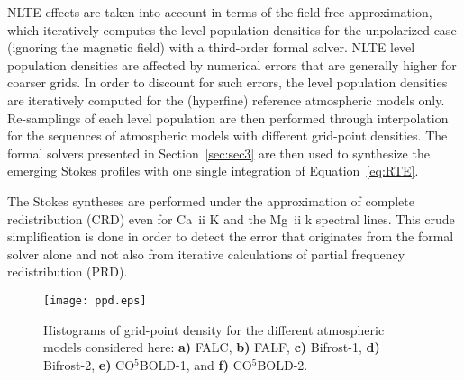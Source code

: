 \documentclass[iop,numberedappendix,twocolappendix,twocolumn]{emulateapj}
\begin{document}
NLTE effects are taken into account in terms of the field-free approximation,
which iteratively computes the level population densities for the unpolarized case (ignoring the magnetic field) with a third-order formal solver. 
NLTE level population densities are affected by numerical errors that are generally higher for coarser grids.
In order to discount for such errors,
the level population densities are iteratively computed for the (hyperfine) reference atmospheric models only.
Re-samplings of each level population are then performed through interpolation for the sequences of atmospheric models with different grid-point densities.
The formal solvers presented in Section~\ref{sec:sec3} are then used to 
synthesize the emerging Stokes profiles with one single integration of Equation~\eqref{eq:RTE}.

The Stokes syntheses are performed under the approximation of complete redistribution (CRD) even for Ca~{\sc ii} K and the Mg~{\sc ii} k spectral lines.
This crude simplification is done in order to detect the error that originates from the formal solver alone and not also from iterative calculations 
of partial frequency redistribution (PRD).
%
\begin{figure*}
\centering
\texttt{[image: ppd.eps]}  \caption{Histograms of grid-point density for the different atmospheric models considered here: {\bf a)} FALC, {\bf b)} FALF, {\bf c)} Bifrost-1, {\bf d)} Bifrost-2, {\bf e)} CO$^5$BOLD-1, and {\bf f)} CO$^5$BOLD-2.}
\label{fig:ppd}
\end{figure*}
%
\end{document}
